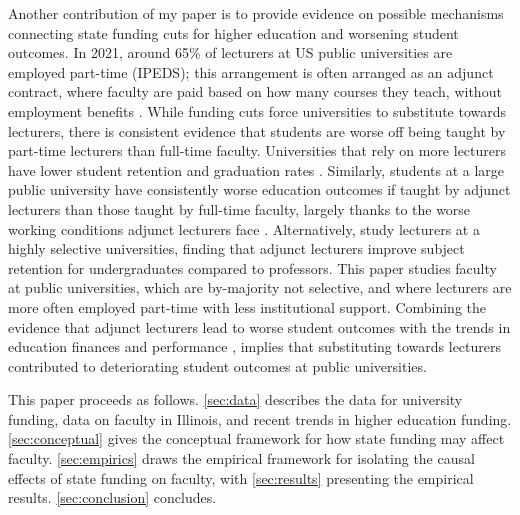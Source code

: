 Another contribution of my paper is to provide evidence on possible mechanisms connecting state funding cuts for higher education and worsening student outcomes.
In 2021, around 65\% of lecturers at US public universities are employed part-time (IPEDS); this arrangement is often arranged as an adjunct contract, where faculty are paid based on how many courses they teach, without employment benefits \citep{aau2014Characteristics}.
While funding cuts force universities to substitute towards lecturers, there is consistent evidence that students are worse off being taught by part-time lecturers than full-time faculty.
Universities that rely on more lecturers have lower student retention and graduation rates \citep{jaeger2011examining,ehrenberg2005tenured}.
Similarly, students at a large public university have consistently worse education outcomes if taught by adjunct lecturers than those taught by full-time faculty, largely thanks to the worse working conditions adjunct lecturers face \citep{zhu2021limited}.
Alternatively, \cite{bettinger2010does,figlio2015tenure} study lecturers at a highly selective universities, finding that adjunct lecturers improve subject retention for undergraduates compared to professors.
This paper studies faculty at public universities, which are by-majority not selective, and where lecturers are more often employed part-time with less institutional support.
Combining the evidence that adjunct lecturers lead to worse student outcomes with the trends in education finances and performance \citep{NBERw23736,NBERw27885}, implies that substituting towards lecturers contributed to deteriorating student outcomes at public universities.

This paper proceeds as follows.
\autoref{sec:data} describes the data for university funding, data on faculty in Illinois, and recent trends in higher education funding.
\autoref{sec:conceptual} gives the conceptual framework for how state funding may affect faculty.
\autoref{sec:empirics} draws the empirical framework for isolating the causal effects of state funding on faculty, with \autoref{sec:results} presenting the empirical results.
\autoref{sec:conclusion} concludes.
